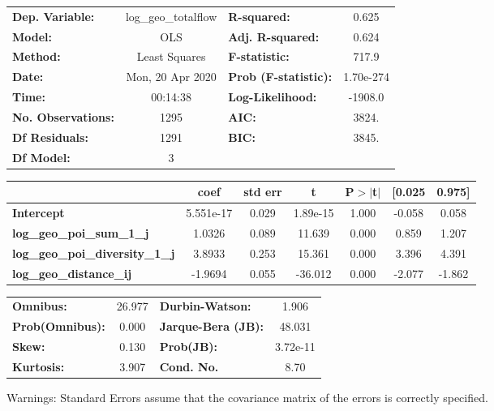 \begin{center}
\begin{tabular}{lclc}
\toprule
\textbf{Dep. Variable:}                 & log\_geo\_totalflow & \textbf{  R-squared:         } &     0.625   \\
\textbf{Model:}                         &         OLS         & \textbf{  Adj. R-squared:    } &     0.624   \\
\textbf{Method:}                        &    Least Squares    & \textbf{  F-statistic:       } &     717.9   \\
\textbf{Date:}                          &   Mon, 20 Apr 2020  & \textbf{  Prob (F-statistic):} & 1.70e-274   \\
\textbf{Time:}                          &       00:14:38      & \textbf{  Log-Likelihood:    } &   -1908.0   \\
\textbf{No. Observations:}              &          1295       & \textbf{  AIC:               } &     3824.   \\
\textbf{Df Residuals:}                  &          1291       & \textbf{  BIC:               } &     3845.   \\
\textbf{Df Model:}                      &             3       & \textbf{                     } &             \\
\bottomrule
\end{tabular}
\begin{tabular}{lcccccc}
                                        & \textbf{coef} & \textbf{std err} & \textbf{t} & \textbf{P$> |$t$|$} & \textbf{[0.025} & \textbf{0.975]}  \\
\midrule
\textbf{Intercept}                      &    5.551e-17  &        0.029     &  1.89e-15  &         1.000        &       -0.058    &        0.058     \\
\textbf{log\_geo\_poi\_sum\_1\_j}       &       1.0326  &        0.089     &    11.639  &         0.000        &        0.859    &        1.207     \\
\textbf{log\_geo\_poi\_diversity\_1\_j} &       3.8933  &        0.253     &    15.361  &         0.000        &        3.396    &        4.391     \\
\textbf{log\_geo\_distance\_ij}         &      -1.9694  &        0.055     &   -36.012  &         0.000        &       -2.077    &       -1.862     \\
\bottomrule
\end{tabular}
\begin{tabular}{lclc}
\textbf{Omnibus:}       & 26.977 & \textbf{  Durbin-Watson:     } &    1.906  \\
\textbf{Prob(Omnibus):} &  0.000 & \textbf{  Jarque-Bera (JB):  } &   48.031  \\
\textbf{Skew:}          &  0.130 & \textbf{  Prob(JB):          } & 3.72e-11  \\
\textbf{Kurtosis:}      &  3.907 & \textbf{  Cond. No.          } &     8.70  \\
\bottomrule
\end{tabular}
\end{center}

Warnings: \newline
 [1] Standard Errors assume that the covariance matrix of the errors is correctly specified.